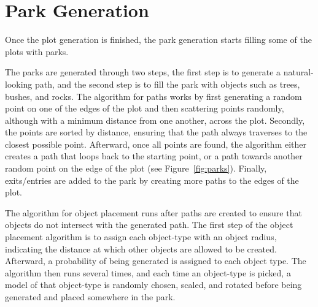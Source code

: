 \section{Park Generation}

Once the plot generation is finished, the park generation starts filling some of the plots with parks.

The parks are generated through two steps, the first step is to generate a natural-looking path, and the second step is to fill the park with objects such as trees, bushes, and rocks. 
The algorithm for paths works by first generating a random point on one of the edges of the plot and then scattering points randomly, although with a minimum distance from one another, across the plot. 
Secondly, the points are sorted by distance, ensuring that the path always traverses to the closest possible point. 
Afterward, once all points are found, the algorithm either creates a path that loops back to the starting point, or a path towards another random point on the edge of the plot (see Figure~\ref{fig:parks}).
Finally, exits/entries are added to the park by creating more paths to the edges of the plot.  

The algorithm for object placement runs after paths are created to ensure that objects do not intersect with the generated path.
The first step of the object placement algorithm is to assign each object-type with an object radius, indicating the distance at which other objects are allowed to be created. 
Afterward, a probability of being generated is assigned to each object type.
The algorithm then runs several times, and each time an object-type is picked, a model of that object-type is randomly chosen, scaled, and rotated before being generated and placed somewhere in the park.

